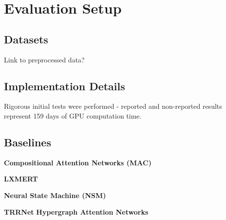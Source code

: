 \chapter{Evaluation Setup}

\section{Datasets}

{\color{red} Link to preprocessed data?}

\section{Implementation Details}

Rigorous initial tests were performed - reported and non-reported results represent 159 days of GPU computation time.

\section{Baselines}

\textbf{Compositional Attention Networks (MAC) \cite{hudson2018compositional}}

\textbf{LXMERT \cite{tan2019lxmert}}

\textbf{Neural State Machine (NSM) \cite{hudson2019learning}}

\textbf{TRRNet} \cite{yangtrrnet}
\textbf{Hypergraph Attention Networks} \cite{kim2020hypergraph}

